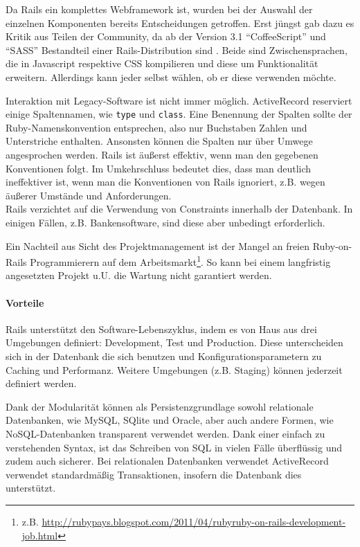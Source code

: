  Da Rails ein komplettes Webframework ist, wurden bei der Auswahl der einzelnen Komponenten bereits Entscheidungen getroffen.  Erst jüngst gab dazu es Kritik aus Teilen der Community, da ab der Version 3.1 "`CoffeeScript"' und "`SASS"' Bestandteil einer Rails-Distribution sind \citep{peter_cooper_rails_2011}. Beide sind Zwischensprachen, die in Javascript respektive CSS kompilieren und diese um Funktionalität erweitern. Allerdings kann jeder selbst wählen, ob er diese verwenden möchte.


Interaktion mit Legacy-Software ist nicht immer möglich. ActiveRecord reserviert einige Spaltennamen, wie \texttt{type} und \texttt{class}. Eine Benennung der Spalten sollte der Ruby-Namenskonvention entsprechen, also nur Buchstaben Zahlen und Unterstriche enthalten. Ansonsten können die Spalten nur über Umwege angesprochen werden. Rails ist äußerst effektiv, wenn man den gegebenen Konventionen folgt. Im Umkehrschluss bedeutet dies, dass man deutlich ineffektiver ist, wenn man die Konventionen von Rails ignoriert, z.B. wegen äußerer Umstände und Anforderungen.\\
Rails verzichtet auf die Verwendung von Constraints innerhalb der Datenbank. In einigen Fällen, z.B. Bankensoftware, sind diese aber unbedingt erforderlich.

Ein Nachteil aus Sicht des Projektmanagement ist der Mangel an freien Ruby-on-Rails Programmierern auf dem Arbeitsmarkt\footnote{z.B. \url{http://rubypays.blogspot.com/2011/04/rubyruby-on-rails-development-job.html}}. So kann bei einem langfristig angesetzten Projekt u.U. die Wartung nicht garantiert werden.

\paragraph{Vorteile}
Rails unterstützt den Software-Lebenszyklus, indem es von Haus aus drei Umgebungen definiert: Development, Test und Production. Diese unterscheiden sich in der Datenbank die sich benutzen und Konfigurationsparametern zu Caching und Performanz. Weitere Umgebungen (z.B. Staging) können jederzeit definiert werden.


Dank der Modularität können als Persistenzgrundlage sowohl relationale Datenbanken, wie MySQL, SQlite und Oracle, aber auch andere Formen, wie NoSQL-Datenbanken transparent verwendet werden. Dank einer einfach zu verstehenden Syntax, ist das Schreiben von SQL in vielen Fälle überflüssig und zudem auch sicherer. Bei relationalen Datenbanken verwendet ActiveRecord verwendet standardmäßig Transaktionen, insofern die Datenbank dies unterstützt.



